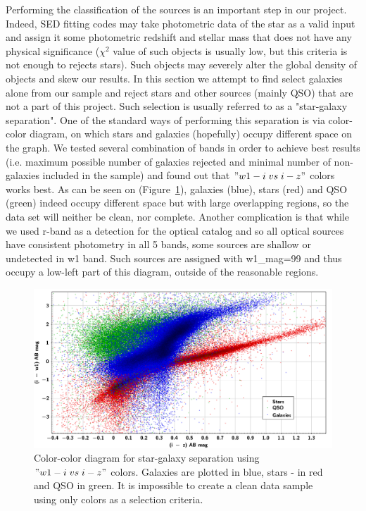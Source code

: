 Performing the classification of the sources is an important step in our project. Indeed, SED fitting codes may take photometric data of the star as a valid input and assign it some photometric redshift and stellar mass that does not have any physical significance ($\chi^{2}$ value of such objects is usually low, but this criteria is not enough to rejects stars). Such objects may severely alter the global density of objects and skew our results. In this section we attempt to find select galaxies alone from our sample and reject stars and other sources (mainly QSO) that are not a part of this project. Such selection is usually referred to as a "star-galaxy separation". One of the standard ways of performing this separation is via color-color diagram, on which stars and galaxies (hopefully) occupy different space on the graph. We tested several combination of bands in order to achieve best results (i.e. maximum possible number of galaxies rejected and minimal number of non-galaxies included in the sample) and found out that $"w1-i\; vs\; i-z"$ colors works best. As can be seen on (Figure~\ref{fig:sgs_color}), galaxies (blue), stars (red) and QSO (green) indeed occupy different space but with large overlapping regions, so the data set will neither be clean, nor complete. Another complication is that while we used r-band as a detection for the optical catalog and so all optical sources have consistent photometry in all 5 bands, some sources are shallow or undetected in w1 band. Such sources are assigned with w1\_{mag}=99 and thus occupy a low-left part of this diagram, outside of the reasonable regions. 

\begin{figure}[!ht]
\includegraphics[width=5.7in]{Figures/star_galaxy_separation_color.png}
\caption{Color-color diagram for star-galaxy separation using $"w1-i\; vs\; i-z"$ colors.  Galaxies are plotted in blue, stars - in red and QSO in green. It is impossible to create a clean data sample using only colors as a selection criteria.}
\label{fig:sgs_color}
\end{figure}


